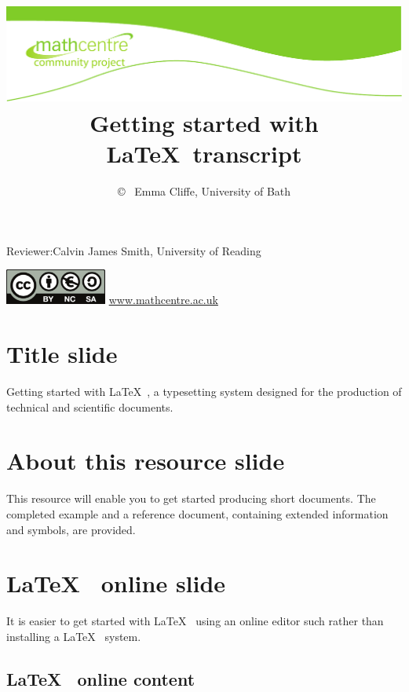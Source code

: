 \documentclass[a4paper,14pt]{extarticle}
\title{
\includegraphics[width=\textwidth]{top-2colsgreen-community}
\\
Getting started with \LaTeX~transcript}
\author{\copyright ~ Emma Cliffe, University of Bath}
\date{}
\begin{document}

\renewcommand{\familydefault}{phv}
\selectfont
\maketitle

Reviewer:\qquad Calvin James Smith, University of Reading

\begin{center}
\includegraphics[width=0.25\textwidth]{by-nc-sa_eu}
\url{www.mathcentre.ac.uk}
\end{center}


\tableofcontents


\section{Title slide}

Getting started with \LaTeX~, a typesetting system designed for the production of technical and scientific documents.

\section{About this resource slide}

This resource will enable you to get started producing short documents. The completed example and a reference document, containing extended information and symbols, are provided. 

\section{\LaTeX~ online slide}

It is easier to get started with \LaTeX~ using an online editor such rather than installing a \LaTeX~ system. 

\subsection{\LaTeX~ online content}
\end{document}
